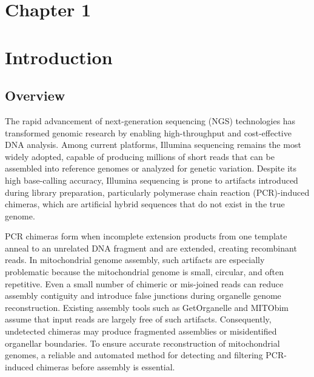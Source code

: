 \section*{Chapter 1}\label{sec:researchdesc}

\section{Introduction}

\subsection{Overview}\label{subsec:overview}

The rapid advancement of next-generation sequencing (NGS) technologies has transformed genomic research by enabling high-throughput and cost-effective DNA analysis\cite{Metzker2010}. Among current platforms, Illumina sequencing remains the most widely adopted, capable of producing millions of short reads that can be assembled into reference genomes or analyzed for genetic variation\cite{Bentley2008,Glenn2011}. Despite its high base-calling accuracy, Illumina sequencing is prone to artifacts introduced during library preparation, particularly polymerase chain reaction (PCR)-induced chimeras, which are artificial hybrid sequences that do not exist in the true genome\cite{Judo1998}.

PCR chimeras form when incomplete extension products from one template anneal to an unrelated DNA fragment and are extended, creating recombinant reads\cite{Qiu2001}. In mitochondrial genome assembly, such artifacts are especially problematic because the mitochondrial genome is small, circular, and often repetitive\cite{Boore1999,Cameron2014}. Even a small number of chimeric or mis-joined reads can reduce assembly contiguity and introduce false junctions during organelle genome reconstruction\cite{Hahn2013,Dierckxsens2017,Jin2020}. Existing assembly tools such as GetOrganelle and MITObim assume that input reads are largely free of such artifacts\cite{Hahn2013,Jin2020}. Consequently, undetected chimeras may produce fragmented assemblies or misidentified organellar boundaries. To ensure accurate reconstruction of mitochondrial genomes, a reliable and automated method for detecting and filtering PCR-induced chimeras before assembly is essential.

